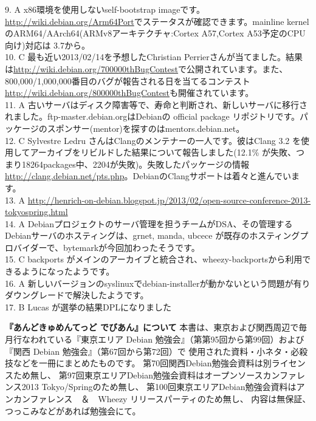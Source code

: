 \documentclass[mingoth,a4paper]{jsarticle}
\begin{document}
{9. A x86環境を使用しないself-bootstrap imageです。\url {http://wiki.debian.org/Arm64Port}でステータスが確認できます。mainline kernelのARM64/AArch64(ARMv8アーキテクチャ:Cortex A57,Cortex A53予定のCPU向け)対応は 3.7から。\\
10. C 最も近い2013/02/14を予想したChristian Perrierさんが当てました。結果は\url {http://wiki.debian.org/700000thBugContest}で公開されています。また、800,000/1,000,000番目のバグが報告される日を当てるコンテスト\url {http://wiki.debian.org/800000thBugContest}も開催されています。\\
11. A 古いサーバはディスク障害等で、寿命と判断され、新しいサーバに移行されました。ftp-master.debian.orgはDebianの official package リポジトリです。パッケージのスポンサー(mentor)を探すのはmentors.debian.net。 \\
12. C Sylvestre Ledru さんはClangのメンテナーの一人です。彼はClang 3.2 を使用してアーカイブをリビルドした結果について報告しました(12.1\% が失敗、つまり18264packages中、2204が失敗)。失敗したパッケージの情報\url {http://clang.debian.net/pts.php}。DebianのClangサポートは着々と進んでいます。\\
13. A \url {http://henrich-on-debian.blogspot.jp/2013/02/open-source-conference-2013-tokyospring.html}\\
14. A Debianプロジェクトのサーバ管理を担うチームがDSA、その管理するDebianサーバのホスティングは、grnet, manda, ubcece が既存のホスティングプロバイダーで、bytemarkが今回加わったそうです。\\
15. C backports がメインのアーカイブと統合され、wheezy-backportsから利用できるようになったようです。\\
16. A 新しいバージョンのsyslinuxでdebian-installerが動かないという問題が有りダウングレードで解決したようです。\\
17. B Lucas が選挙の結果DPLになりました\\
}

\pagestyle{empty}
\cleartoevenpage

\newpage
{
\large
\begin{itembox}{\bf 『あんどきゅめんてっど でびあん』について}
本書は、東京および関西周辺で毎月行なわれている『東京エリア Debian 勉強会』（第第95回から第99回）および
『関西 Debian 勉強会』（第67回から第72回）で
使用された資料・小ネタ・必殺技などを一冊にまとめたものです。
第70回関西Debian勉強会資料は別ライセンスため無し、
第97回東京エリアDebian勉強会資料はオープンソースカンファレンス2013 Tokyo/Springのため無し、
第100回東京エリアDebian勉強会資料はアンカンファレンス　＆　Wheezy リリースパーティのため無し、
内容は無保証、つっこみなどがあれば勉強会にて。
\end{itembox}
}
\end{document}
